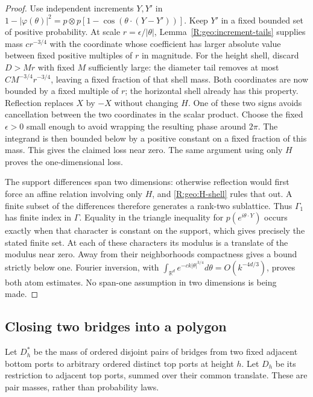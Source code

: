 \begin{proof}
Use independent increments $Y,Y'$ in
$1-|\varphi(\theta)|^2=p\otimes p[1-\cos(\theta\cdot(Y-Y'))]$.
Keep $Y'$ in a fixed bounded set of positive probability.  At scale
$r=\epsilon/|\theta|$, Lemma~\ref{R:geo:increment-tails} supplies mass
$c r^{-3/4}$ with the coordinate whose coefficient has larger absolute
value between fixed positive multiples of $r$ in magnitude.  For the
height shell, discard $D>Mr$ with fixed $M$ sufficiently large: the
diameter tail removes at most $CM^{-3/4}r^{-3/4}$, leaving a fixed
fraction of that shell mass.  Both coordinates are now bounded by a
fixed multiple of $r$; the horizontal shell already has this property.
Reflection replaces $X$ by $-X$ without changing $H$.  One of these two
signs avoids cancellation between the two coordinates in the scalar
product.  Choose the fixed $\epsilon>0$ small enough to avoid wrapping
the resulting phase around $2\pi$.  The integrand is then bounded below
by a positive constant on a fixed fraction of this mass.  This gives
the claimed loss near zero.  The same argument using only $H$ proves
the one-dimensional loss.

The support differences span two dimensions: otherwise reflection
would first force an affine relation involving only $H$, and
\eqref{R:geo:H-shell} rules that out.  A finite subset of the differences
therefore generates a rank-two sublattice.  Thus $\Gamma_1$ has finite
index in $\Gamma$.  Equality in the triangle inequality for
$p(e^{i\theta\cdot Y})$ occurs exactly when that character is constant
on the support, which gives precisely the stated finite set.  At each
of these characters its modulus is a translate of the modulus near
zero.  Away from their neighborhoods compactness gives a bound strictly
below one.  Fourier inversion, with
$\int_{\mathbb R^d}e^{-c k|\theta|^{3/4}}d\theta=O(k^{-4d/3})$,
proves both atom estimates.  No span-one assumption in two dimensions
is being made.
\end{proof}

\subsection{Closing two bridges into a polygon}

Let $D_h^*$ be the mass of ordered disjoint pairs of bridges from two
fixed adjacent bottom ports to arbitrary ordered distinct top ports at
height $h$.  Let $D_h$ be its restriction to adjacent top ports,
summed over their common translate.  These are pair masses, rather than
probability laws.

